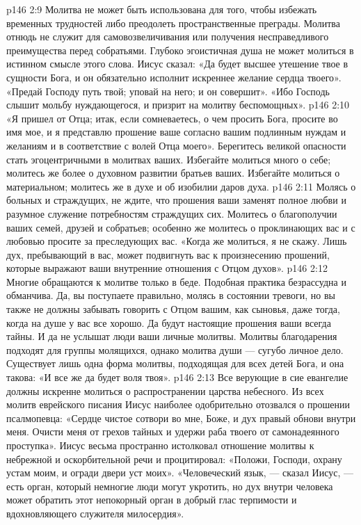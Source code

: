 \vs p146 2:9 \pc {}\bibnobreakspace Молитва не может быть использована для того, чтобы избежать временных трудностей либо преодолеть пространственные преграды. Молитва отнюдь не служит для самовозвеличивания или получения несправедливого преимущества перед собратьями. Глубоко эгоистичная душа не может молиться в истинном смысле этого слова. Иисус сказал: «Да будет высшее утешение твое в сущности Бога, и он обязательно исполнит искреннее желание сердца твоего». «Предай Господу путь твой; уповай на него; и он совершит». «Ибо Господь слышит мольбу нуждающегося, и призрит на молитву беспомощных».
\vs p146 2:10 \pc {}\bibnobreakspace «Я пришел от Отца; итак, если сомневаетесь, о чем просить Бога, просите во имя мое, и я представлю прошение ваше согласно вашим подлинным нуждам и желаниям и в соответствие с волей Отца моего». Берегитесь великой опасности стать эгоцентричными в молитвах ваших. Избегайте молиться много о себе; молитесь же более о духовном развитии братьев ваших. Избегайте молиться о материальном; молитесь же в духе и об изобилии даров духа.
\vs p146 2:11 \pc {}\bibnobreakspace Молясь о больных и страждущих, не ждите, что прошения ваши заменят полное любви и разумное служение потребностям страждущих сих. Молитесь о благополучии ваших семей, друзей и собратьев; особенно же молитесь о проклинающих вас и с любовью просите за преследующих вас. «Когда же молиться, я не скажу. Лишь дух, пребывающий в вас, может подвигнуть вас к произнесению прошений, которые выражают ваши внутренние отношения с Отцом духов».
\vs p146 2:12 \pc {}\bibnobreakspace Многие обращаются к молитве только в беде. Подобная практика безрассудна и обманчива. Да, вы поступаете правильно, молясь в состоянии тревоги, но вы также не должны забывать говорить с Отцом вашим, как сыновья, даже тогда, когда на душе у вас все хорошо. Да будут настоящие прошения ваши всегда тайны. И да не услышат люди ваши личные молитвы. Молитвы благодарения подходят для группы молящихся, однако молитва души --- сугубо личное дело. Существует лишь одна форма молитвы, подходящая для всех детей Бога, и она такова: «И все же да будет воля твоя».
\vs p146 2:13 \pc {}\bibnobreakspace Все верующие в сие евангелие должны искренне молиться о распространении царства небесного. Из всех молитв еврейского писания Иисус наиболее одобрительно отозвался о прошении псалмопевца: «Сердце чистое сотвори во мне, Боже, и дух правый обнови внутри меня. Очисти меня от грехов тайных и удержи раба твоего от самонадеянного проступка». Иисус весьма пространно истолковал отношение молитвы к небрежной и оскорбительной речи и процитировал: «Положи, Господи, охрану устам моим, и огради двери уст моих». «Человеческий язык, --- сказал Иисус, --- есть орган, который немногие люди могут укротить, но дух внутри человека может обратить этот непокорный орган в добрый глас терпимости и вдохновляющего служителя милосердия».
